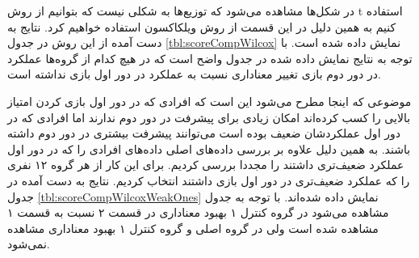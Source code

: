 \documentclass[twoside, a4paper,11pt]{book}
\numberwithin{equation}{chapter}
\numberwithin{table}{chapter}
\numberwithin{figure}{chapter}
\numberwithin{equation}{chapter}
\begin{document}
در شکل‌ها مشاهده می‌شود که توزیع‌ها به شکلی نیست که بتوانیم از روش t استفاده کنیم به همین دلیل در این قسمت از روش ویلکاکسون استفاده خواهیم کرد. نتایج به دست آمده از این روش در جدول \ref{tbl:scoreCompWilcox} نمایش داده شده است. با توجه به نتایج نمایش داده شده در جدول واضح است که در هیچ کدام از گروه‌ها عملکرد در دور دوم بازی تغییر معناداری نسبت به عملکرد در دور اول بازی نداشته است.


\begin{table}[]
\end{table}

موضوعی که اینجا مطرح می‌شود این است که افرادی که در دور اول بازی کردن امتیاز بالایی را کسب کرده‌اند امکان زیادی برای پیشرفت در دور دوم ندارند اما افرادی که در دور اول عملکردشان ضعیف بوده است می‌توانند پیشرفت بیشتری در دور دوم داشته باشند. به همین دلیل علاوه بر بررسی داده‌های اصلی داده‌های افرادی را که در دور اول عملکرد ضعیف‌تری داشتند را مجددا بررسی کردیم. برای این کار از هر گروه ۱۲ نفری را که عملکرد ضعیف‌تری در دور اول بازی داشتند انتخاب کردیم. نتایج به دست آمده در جدول \ref{tbl:scoreCompWilcoxWeakOnes} نمایش داده شده‌اند. با توجه به جدول مشاهده می‌شود در گروه کنترل ۱ بهبود معناداری در قسمت ۲ نسبت به قسمت ۱ مشاهده شده است ولی در گروه اصلی و گروه کنترل ۱ بهبود معناداری مشاهده نمی‌شود.
\end{document}
